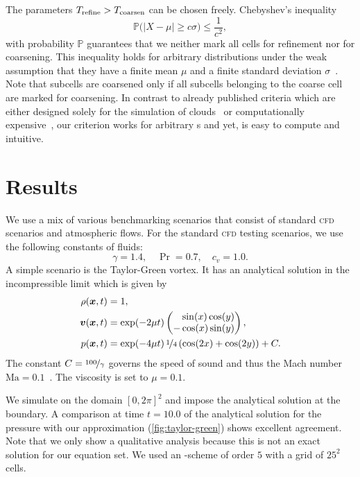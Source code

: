 \documentclass[runningheads]{llncs}
\begin{document}
The parameters $T_\text{refine} > T_\text{coarsen}$ can be chosen freely.
Chebyshev's inequality
\begin{equation}
  \label{eq:chebychev}
  \mathbb{P}\bigl(\vert X - \mu \vert \geq c \sigma \bigr) \leq \frac{1}{c^2},
\end{equation}
with probability $\mathbb{P}$ guarantees that we neither mark all cells for refinement nor for coarsening.
This inequality holds for arbitrary distributions under the weak assumption that they have a finite mean $\mu$ and a finite standard deviation $\sigma$~\cite{wasserman2004all}.
Note that subcells are coarsened only if all subcells belonging to the coarse cell are marked for coarsening.
In contrast to already published criteria which are either designed solely for the simulation of clouds~\cite{muller2010adaptive} or computationally expensive~\cite{fambri2017space}, our criterion works for arbitrary \pde{}s and yet, is easy to compute and intuitive.

\section{Results}
We use a mix of various benchmarking scenarios that consist of standard \textsc{cfd} scenarios and atmospheric flows.
%
For the standard \textsc{cfd} testing scenarios, we use the following constants of fluids:
\begin{equation}
  \gamma = 1.4, \quad \Pr = 0.7, \quad c_v = 1.0.
\end{equation}
A simple scenario is the Taylor-Green vortex.
It has an analytical solution in the incompressible limit which is given by
\begin{align}
  \label{eq:taylor-green}
  \begin{split}
  \rho(\bm{x}, t) &= 1,\\
  \bm{v}(\bm{x}, t) &= \exp(-2 \mu t)
  \begin{pmatrix}
    \phantom{-}\sin(x) \cos(y) \\
- \cos(x) \sin(y) 
    \end{pmatrix}, \\
  p(\bm{x}, t) &= \exp(-4 \mu t) \, \nicefrac{1}{4} \left( \cos(2x) + \cos(2y) \right) + C.
  \end{split}
\end{align}
The constant $C = \nicefrac{100}{\gamma}$ governs the speed of sound and thus the Mach number $\text{Ma} = 0.1$~\cite{dumbser2016high}. The viscosity is set to $\mu = 0.1$. 

We simulate on the domain $[0,2\pi]^2$ 
and impose the analytical solution at the boundary.
A comparison at time $t = 10.0$ of the analytical solution for the pressure with our approximation (\cref{fig:taylor-green}) shows excellent agreement.
Note that we only show a qualitative analysis because this is not an exact solution for our equation set.
We used an \aderdg{}-scheme of order $5$ with a grid of $25^2$ cells.
\end{document}
